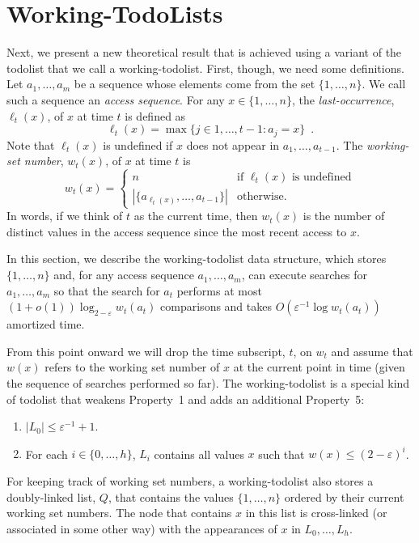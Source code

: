 \documentclass{patmorin}
\newcommand{\eps}{\varepsilon}
\begin{document}
\section{Working-TodoLists}

Next, we present a new theoretical result that is achieved using a
variant of the todolist that we call a working-todolist.  First, though, we need
some definitions.  Let $a_1,\ldots,a_m$ be a sequence whose elements come
from the set $\{1,\ldots,n\}$.  We call such a sequence an \emph{access
sequence}. For any $x\in\{1,\ldots,n\}$, the \emph{last-occurrence},
$\ell_t(x)$, of $x$ at time $t$ is defined as
\[
   \ell_t(x)=\max\{j\in{1,\ldots,t-1}: a_{j} = x\} \enspace .
\]
Note that $\ell_t(x)$ is undefined if $x$ does not appear in
$a_1,\ldots,a_{t-1}$.  The \emph{working-set number}, $w_t(x)$, of $x$
at time $t$ is
\[
    w_t(x) = \begin{cases}
               n & \text{if $\ell_t(x)$ is undefined} \\
               |\{a_{\ell_t(x)},\ldots,a_{t-1}\}| & \text{otherwise.}
             \end{cases}
\]
In words, if we think of $t$ as the current time, then $w_t(x)$ is the
number of distinct values in the access sequence since the most recent
access to $x$.

In this section, we describe the working-todolist data structure, which
stores $\{1,\ldots,n\}$ and, for any access sequence $a_1,\ldots,a_m$,
can execute searches for $a_1,\ldots,a_m$ so that the search for $a_t$
performs at most $(1+o(1))\log_{2-\eps} w_t(a_t)$ comparisons and takes
$O(\eps^{-1}\log w_t(a_t))$ amortized time.

From this point onward we will drop the time subscript, $t$, on $w_t$
and assume that $w(x)$ refers to the working set number of $x$ at the
current point in time (given the sequence of searches performed so far).
The working-todolist is a special kind of todolist that weakens Property~1
and adds an additional Property~5:

\begin{enumerate}
\item $|L_0|\le \eps^{-1}+1$.
\setcounter{enumi}{4}
\item For each $i\in\{0,\ldots,h\}$, $L_i$ contains all values $x$ such that $w(x)\le (2-\eps)^i$.
\end{enumerate}

For keeping track of working set numbers, a working-todolist also stores a
doubly-linked list, $Q$, that contains the values $\{1,\ldots,n\}$
ordered by their current working set numbers.  The node that contains $x$
in this list is cross-linked (or associated in some other way) with the
appearances of $x$ in $L_0,\ldots,L_h$.
\end{document}
